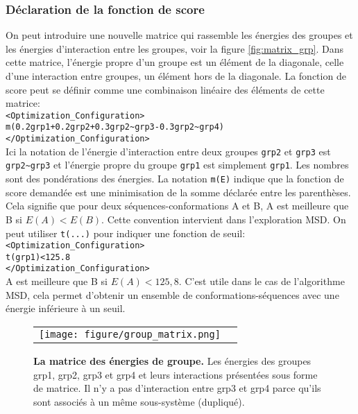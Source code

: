 \subsubsection{Déclaration de la fonction de score}
\label{sub:score}
On peut introduire une nouvelle matrice qui rassemble les énergies des groupes et les énergies d'interaction entre les groupes, voir la figure \ref{fig:matrix_grp}. Dans cette matrice, l'énergie propre d'un groupe est un élément de la diagonale, celle d'une interaction entre groupes, un élément hors de la diagonale. La fonction de score peut se définir comme une combinaison linéaire des éléments de cette matrice:\\
\verb!<Optimization_Configuration>! \\
\verb!m(0.2grp1+0.2grp2+0.3grp2~grp3-0.3grp2~grp4)! \\
\verb!</Optimization_Configuration>! \\
Ici la notation de l'énergie d'interaction entre deux groupes \verb!grp2! et \verb!grp3! est \verb!grp2~grp3! et l'énergie propre du groupe \verb!grp1! est simplement \verb!grp1!. Les nombres sont des pondérations des énergies. La notation \verb!m(E)! indique que la fonction de score demandée est une minimisation de la somme déclarée entre les parenthèses. Cela signifie que pour deux séquences-conformations A et B, A est meilleure que B si $E(A) < E(B)$. Cette convention intervient dans l'exploration MSD. On peut utiliser \verb!t(...)! pour indiquer une fonction de seuil:\\
\verb!<Optimization_Configuration>! \\
\verb!t(grp1)<125.8! \\
\verb!</Optimization_Configuration>! \\
A est meilleure que B si $E(A)<125,8$. C'est utile dans le cas de l'algorithme MSD, cela permet d'obtenir un ensemble de conformations-séquences avec une énergie inférieure à un seuil.
\begin{figure}[!htbp]
  \centering
  \begin{tabular}{cc}
    \texttt{[image: figure/group\_matrix.png]} &
  \end{tabular}
  
  \caption{\textbf{La matrice des énergies de groupe.} Les énergies des groupes grp1, grp2, grp3 et grp4 et leurs interactions présentées sous forme de matrice. Il n'y a pas d'interaction entre grp3 et grp4 parce qu'ils sont associés à un même sous-système (dupliqué).}
  \label{fig:groupmatrix}
\end{figure}



